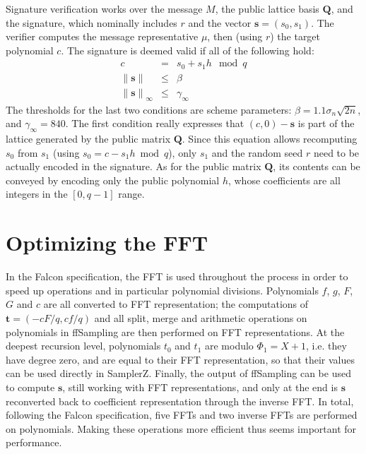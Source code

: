 \documentclass{llncs}
\newcommand{\norm}[1]{\left\|#1\right\|}
\newcommand{\norminf}[1]{\norm{#1}_{\infty}}
\begin{document}
Signature verification works over the message $M$, the public lattice
basis $\mathbf{Q}$, and the signature, which nominally includes $r$ and
the vector $\mathbf{s} = (s_0, s_1)$. The verifier computes the message
representative $\mu$, then (using $r$) the target polynomial $c$. The
signature is deemed valid if all of the following hold:
\begin{eqnarray*}
    c &=& s_0 + s_1 h \mod q \\
    \norm{\mathbf{s}} &\leq& \beta \\
    \norminf{\mathbf{s}} &\leq& \gamma_\infty
\end{eqnarray*}
The thresholds for the last two conditions are scheme parameters:
$\beta = 1.1 \sigma_n \sqrt{2n}$, and $\gamma_\infty = 840$. The first
condition really expresses that $(c, 0) - \mathbf{s}$ is part of the
lattice generated by the public matrix $\mathbf{Q}$. Since this equation
allows recomputing $s_0$ from $s_1$ (using $s_0 = c - s_1 h \bmod q$),
only $s_1$ and the random seed $r$ need to be actually encoded in the
signature. As for the public matrix $\mathbf{Q}$, its contents can be
conveyed by encoding only the public polynomial $h$, whose coefficients
are all integers in the $[0, q-1]$ range.


\newpage
\section{Optimizing the FFT}\label{sec:fft}

In the Falcon specification, the FFT is used throughout the process in
order to speed up operations and in particular polynomial divisions.
Polynomials $f$, $g$, $F$, $G$ and $c$ are all converted to FFT
representation; the computations of $\mathbf{t} = (-cF/q, cf/q)$ and all
\textsf{split}, \textsf{merge} and arithmetic operations on polynomials
in \textsf{ffSampling} are then performed on FFT representations. At the
deepest recursion level, polynomials $t_0$ and $t_1$ are modulo $\Phi_1
= X + 1$, i.e. they have degree zero, and are equal to their FFT
representation, so that their values can be used directly in
\textsf{SamplerZ}. Finally, the output of \textsf{ffSampling} can be
used to compute $\mathbf{s}$, still working with FFT representations,
and only at the end is $\mathbf{s}$ reconverted back to coefficient
representation through the inverse FFT. In total, following the Falcon
specification, five FFTs and two inverse FFTs are performed on
polynomials. Making these operations more efficient thus seems important
for performance.
\end{document}
